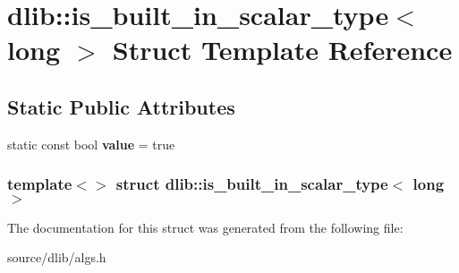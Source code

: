\hypertarget{structdlib_1_1is__built__in__scalar__type_3_01long_01_4}{
\section{dlib::is\_\-built\_\-in\_\-scalar\_\-type$<$ long $>$ Struct Template Reference}
\label{structdlib_1_1is__built__in__scalar__type_3_01long_01_4}
}
\subsection*{Static Public Attributes}
\begin{DoxyCompactItemize}
\item 
\hypertarget{structdlib_1_1is__built__in__scalar__type_3_01long_01_4_a07e6730fe56ee02bcb0445a5595d4872}{
static const bool {\bfseries value} = true}
\label{structdlib_1_1is__built__in__scalar__type_3_01long_01_4_a07e6730fe56ee02bcb0445a5595d4872}

\end{DoxyCompactItemize}
\subsubsection*{template$<$$>$ struct dlib::is\_\-built\_\-in\_\-scalar\_\-type$<$ long $>$}



The documentation for this struct was generated from the following file:\begin{DoxyCompactItemize}
\item 
source/dlib/algs.h\end{DoxyCompactItemize}
